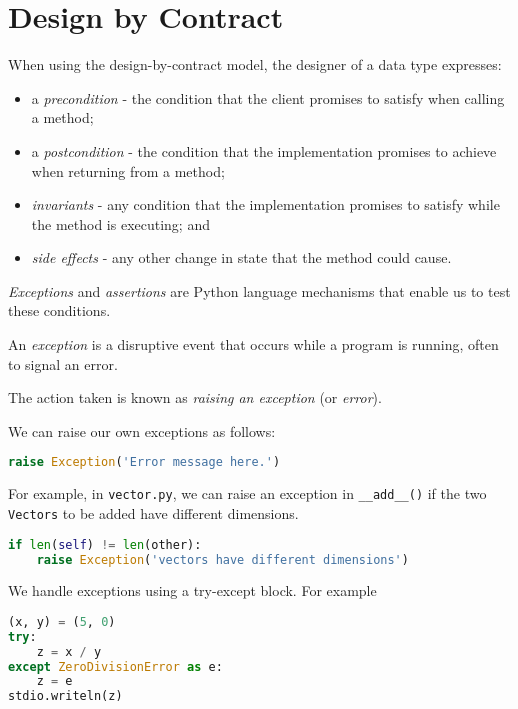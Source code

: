 \documentclass[8pt,a4paper,compress,handout]{beamer}
\begin{document}
\section{Design by Contract}
\begin{frame}[fragile]
When using the design-by-contract model, the designer of a data type expresses:
\begin{itemize}
\item a \emph{precondition} - the condition that the client promises to satisfy when calling a method;
\item a \emph{postcondition} - the condition that the implementation promises to achieve when returning from a method;
\item \emph{invariants} - any condition that the implementation promises to satisfy while the method is executing; and 
\item \emph{side effects} - any other change in state that the method could cause.
\end{itemize}

\bigskip

\emph{Exceptions} and \emph{assertions} are Python language mechanisms that enable us to test these conditions.
\end{frame}

\begin{frame}[fragile]
An \emph{exception} is a disruptive event that occurs while a program is running, often to signal an error. 

\bigskip

The action taken is known as \emph{raising an exception} (or \emph{error}).

\bigskip

We can raise our own exceptions as follows:
\begin{lstlisting}[language=Python]
raise Exception('Error message here.')
\end{lstlisting} 

\bigskip

For example, in \lstinline{vector.py}, we can raise an exception in \lstinline{__add__()} if the two \lstinline{Vectors} to be added have different dimensions. 
\begin{lstlisting}[language=Python]
if len(self) != len(other):
    raise Exception('vectors have different dimensions')
\end{lstlisting} 

\bigskip

We handle exceptions using a try-except block. For example
\begin{lstlisting}[language=Python]
(x, y) = (5, 0)
try:
    z = x / y
except ZeroDivisionError as e:
    z = e
stdio.writeln(z)
\end{lstlisting} 
\end{frame}
\end{document}
